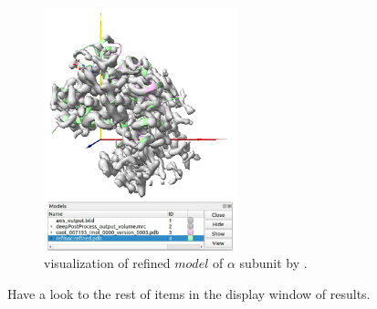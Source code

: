   \begin{figure}[H]
  \centering 
  \captionsetup{width=.9\linewidth} 
  \includegraphics[width=0.50\textwidth]{Images/Fig33}
  \caption{\chimera visualization of refined $model$ of  $\alpha$ subunit by .}
  \label{fig:refmac_chimera}
  \end{figure}
  
  Have a look to the rest of items in the display window of results. 
  
